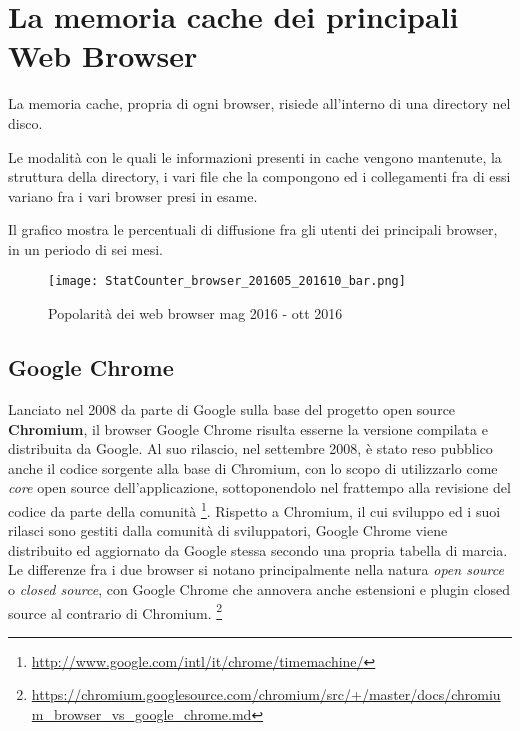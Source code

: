\chapter{La memoria cache dei principali Web Browser}

La memoria cache, propria di ogni browser, risiede all'interno di una directory nel disco. 

Le modalità con le quali le informazioni presenti in cache vengono mantenute, la struttura della directory, i vari file che la compongono ed i collegamenti fra di essi variano fra i vari browser presi in esame. 

Il grafico mostra le percentuali di diffusione fra gli utenti dei principali browser, in un periodo di sei mesi.

\begin{figure}[htpb]
	\begin{center}
		\texttt{[image: StatCounter\_browser\_201605\_201610\_bar.png]}
	\end{center}
\caption[Popolarità dei web browsers mag 2016 - ott 2016]{Popolarità dei web browser mag 2016 - ott 2016 \footnotemark}
\end{figure}

\section{Google Chrome}

Lanciato nel 2008 da parte di Google sulla base del progetto open source \textbf{Chromium}, il browser Google Chrome risulta esserne la versione compilata e distribuita da Google.
Al suo rilascio, nel settembre 2008, è stato reso pubblico anche il codice sorgente alla base di Chromium, con lo scopo di utilizzarlo come \textit{core} open source dell'applicazione, sottoponendolo nel frattempo alla revisione del codice da parte della comunità \footnote{\url{http://www.google.com/intl/it/chrome/timemachine/}}. 
Rispetto a Chromium, il cui sviluppo ed i suoi rilasci sono gestiti dalla comunità di sviluppatori, Google Chrome viene distribuito ed aggiornato da Google stessa secondo una propria tabella di marcia.
Le differenze fra i due browser si notano principalmente nella natura \textit{open source} o \textit{closed source}, con Google Chrome che annovera anche estensioni e plugin closed source al contrario di Chromium. \footnote{\url{https://chromium.googlesource.com/chromium/src/+/master/docs/chromium_browser_vs_google_chrome.md}} \nocite{Chromium}

